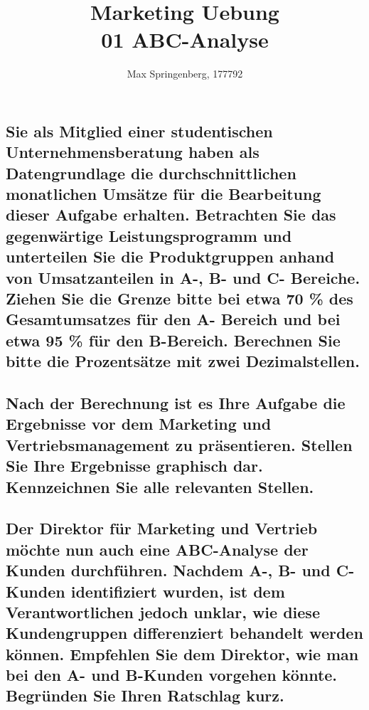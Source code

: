 \documentclass{article}
\author{Max Springenberg, 177792}
\title{
    Marketing Uebung\\
    01 ABC-Analyse
}
\date{}
\begin{document}
\maketitle
\newpage

\subsection{Sie als Mitglied einer studentischen Unternehmensberatung haben als
Datengrundlage die durchschnittlichen monatlichen Umsätze für die Bearbeitung
dieser Aufgabe erhalten. Betrachten Sie das gegenwärtige Leistungsprogramm und
unterteilen Sie die Produktgruppen anhand von Umsatzanteilen in A-, B- und C-
Bereiche. Ziehen Sie die Grenze bitte bei etwa 70 \% des Gesamtumsatzes für den A-
Bereich und bei etwa 95 \% für den B-Bereich. Berechnen Sie bitte die Prozentsätze
mit zwei Dezimalstellen.}

\subsection{}

\subsection{Nach der Berechnung ist es Ihre Aufgabe die Ergebnisse vor dem Marketing und
Vertriebsmanagement zu präsentieren. Stellen Sie Ihre Ergebnisse graphisch dar.
Kennzeichnen Sie alle relevanten Stellen.}

\subsection{Der Direktor für Marketing und Vertrieb möchte nun auch eine ABC-Analyse der
Kunden durchführen. Nachdem A-, B- und C-Kunden identifiziert wurden, ist dem
Verantwortlichen jedoch unklar, wie diese Kundengruppen differenziert
behandelt werden können. Empfehlen Sie dem Direktor, wie man bei den A- und
B-Kunden vorgehen könnte. Begründen Sie Ihren Ratschlag kurz.}
\end{document}
